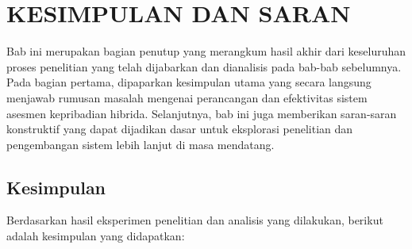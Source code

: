 \chapter{KESIMPULAN DAN SARAN}
\label{chap:kesimpulan-saran}

Bab ini merupakan bagian penutup yang merangkum hasil akhir dari keseluruhan proses penelitian yang telah dijabarkan dan dianalisis pada bab-bab sebelumnya. Pada bagian pertama, dipaparkan kesimpulan utama yang secara langsung menjawab rumusan masalah mengenai perancangan dan efektivitas sistem asesmen kepribadian hibrida. Selanjutnya, bab ini juga memberikan saran-saran konstruktif yang dapat dijadikan dasar untuk eksplorasi penelitian dan pengembangan sistem lebih lanjut di masa mendatang.

\section{Kesimpulan}
\label{sec:kesimpulan}

Berdasarkan hasil eksperimen penelitian dan analisis yang dilakukan, berikut adalah kesimpulan yang didapatkan:

